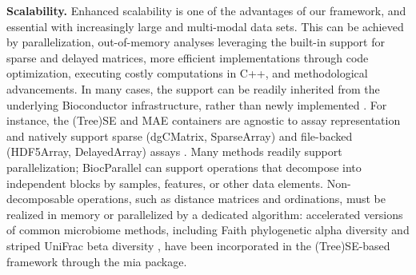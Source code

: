 \documentclass[
  sn-nature,
]{sn-jnl}
\begin{document}
\textbf{Scalability.} Enhanced scalability is one of the advantages of
our framework, and essential with increasingly large and multi-modal
data sets. This can be achieved by parallelization, out-of-memory
analyses leveraging the built-in support for sparse and delayed
matrices, more efficient implementations through code optimization,
executing costly computations in C++, and methodological advancements.
In many cases, the support can be readily inherited from the underlying
Bioconductor infrastructure, rather than newly implemented
\citep{lun2018beachmat}. For instance, the (Tree)SE and MAE containers
are agnostic to assay representation and natively support sparse
(dgCMatrix, SparseArray) and file-backed (HDF5Array, DelayedArray)
assays \citep{huber2015}. Many methods readily support parallelization;
BiocParallel can support operations that decompose into independent
blocks by samples, features, or other data elements. Non-decomposable
operations, such as distance matrices and ordinations, must be realized
in memory or parallelized by a dedicated algorithm: accelerated versions
of common microbiome methods, including Faith phylogenetic alpha
diversity \citep{armstrong2021} and striped UniFrac beta diversity
\citep{mcdonald2018}, have been incorporated in the (Tree)SE-based
framework through the mia package.
\end{document}
